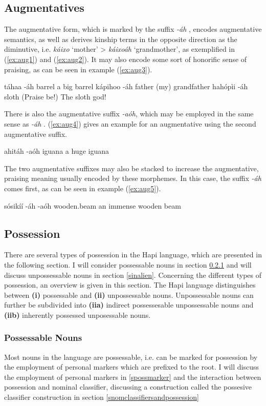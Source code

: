 \documentclass[a4paper, 12pt, oneside]{memoir}
\newcommand{\emh}[1]{\textit{#1}}
\begin{document}
\subsection{Augmentatives}\label{saug}
The augmentative form, which is marked by the suffix \emh{-áh} \Aug, encodes augmentative semantics, as well as derives kinship terms in the opposite direction as the diminutive, i.e. \emh{káixo} `mother' > \emh{káixoáh} `grandmother', as exemplified in (\ref{ex:aug1}) and (\ref{ex:aug2}). It may also encode some sort of honorific sense of praising, as can be seen in example (\ref{ex:aug3}).
\begin{examples}
\ex
\label{ex:aug1}
\bits táhaa -áh 
\gloss barrel {\Aug}
\tr a big barrel
\ex
\label{ex:aug2}
\bits kápihoo -áh
\gloss father {\Aug}
\tr (my) grandfather
\ex
\label{ex:aug3}
\bits hahópìi -áh
\gloss sloth {\Aug}
\tr (Praise be!) The sloth god!
\end{examples}
There is also the augmentative suffix \emh{-aóh}, which may be employed in the same sense as \emh{-áh} \Aug. (\ref{ex:aug4}) gives an example for an augmentative using the second augmentative suffix.
\begin{examples}
\ex 
\label{ex:aug4} 
\bits ahitáh -aóh
\gloss iguana {\Auga}
\tr a huge iguana
\end{examples}
The two augmentative suffixes may also be stacked to increase the augmentative, praising meaning usually encoded by these morphemes. In this case, the suffix \emh{-áh} comes first, as can be seen in example (\ref{ex:aug5}).
\begin{examples}
\ex
\label{ex:aug5}
\bits sósikíí -áh -aóh
\gloss wooden.beam {\Aug} {\Auga}
\tr an immense wooden beam
\end{examples}
\subsection{Possession}\label{spossession}
There are several types of possession in the Hapi language, which are presented in the following section. I will consider possessable nouns in section \ref{salien} and will discuss unpossessable nouns in section \ref{sinalien}. Concerning the different types of possession, an overview is given in this section. The Hapi language distinguishes between \textbf{(i)} possessable and \textbf{(ii)} unpossessable nouns. Unpossessable nouns can further be subdivided into \textbf{(iia)} indirect possessesable unpossessable nouns and \textbf{(iib)} inherently possessed unposessable nouns. 
\subsubsection{Possessable Nouns}\label{salien}
Most nouns in the language are possessable, i.e. can be marked for possession by the employment of personal markers which are prefixed to the root. I will discuss the employment of personal markers in \ref{spossmarker} and the interaction between possession and nominal classifier, discussing a construction called the possesive classifier construction in section \ref{snomclassifiersandpossession}
\end{document}
